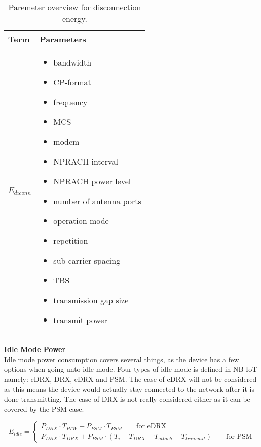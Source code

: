 \begin{table}[H]
\centering
\begin{tabular}{|m{3cm}|m{6cm}|} \hline
\textbf{Term} & \textbf{Parameters} \\ \hline
$E_{diconn}$ & \begin{itemize}
\item bandwidth
\item \gls{CP}-format
\item frequency
\item \gls{MCS}
\item modem 
\item NPRACH interval
\item NPRACH power level
\item number of antenna ports
\item operation mode
\item repetition
\item sub-carrier spacing
\item \gls{TBS}
\item transmission gap size
\item transmit power
\end{itemize} \\ \hline
\end{tabular}
\caption{Paremeter overview for disconnection energy.}
\label{tab:Erelease_parameter_overview}
\end{table}

\textbf{Idle Mode Power}\\
Idle mode power consumption covers several things, as the device has a few options when going unto idle mode. Four types of idle mode is defined in \gls{NB-IoT} namely: \gls{cDRX}, \gls{DRX}, \gls{eDRX} and \gls{PSM}. The case of cDRX will not be considered as this means the device would actually stay connected to the network after it is done transmitting. The case of DRX is not really considered either as it can be covered by the PSM case. 
  
\begin{equation}
E_{idle} = \begin{cases} P_{DRX}\cdot T_{PTW}+P_{PSM}\cdot T_{PSM} \qquad \text{for eDRX}\\
			 P_{DRX}\cdot T_{DRX} + P_{PSM}\cdot (T_i-T_{DRX}-T_{attach}-T_{transmit}) \qquad \text{for PSM}
		   \end{cases}
\end{equation}
\begin{where}
\end{where}


